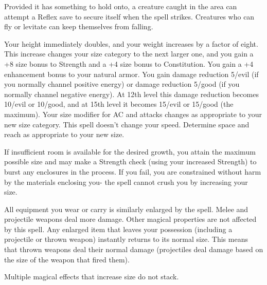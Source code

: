 \begin{multicols}{2}
\begin{small}
\smallskip\noindent Provided it has something to hold onto, a creature caught in the area can attempt a Reflex save to secure itself when the spell strikes. Creatures who can fly or levitate can keep themselves from falling.


\noindent Your height immediately doubles, and your weight increases by a factor of eight. This increase changes your size category to the next larger one, and you gain a +8 size bonus to Strength and a +4 size bonus to Constitution. You gain a +4 enhancement bonus to your natural armor. You gain damage reduction 5/evil (if you normally channel positive energy) or damage reduction 5/good (if you normally channel negative energy). At 12th level this damage reduction becomes 10/evil or 10/good, and at 15th level it becomes 15/evil or 15/good (the maximum). Your size modifier for AC and attacks changes as appropriate to your new size category. This spell doesn't change your speed.  Determine space and reach as appropriate to your new size.

\smallskip\noindent If insufficient room is available for the desired growth, you attain the maximum possible size and may make a Strength check (using your increased Strength) to burst any enclosures in the process. If you fail, you are constrained without harm by the materials enclosing you- the spell cannot crush you by increasing your size.

\smallskip\noindent All equipment you wear or carry is similarly enlarged by the spell. Melee and projectile weapons deal more damage. Other magical properties are not affected by this spell. Any enlarged item that leaves your possession (including a projectile or thrown weapon) instantly returns to its normal size. This means that thrown weapons deal their normal damage (projectiles deal damage based on the size of the weapon that fired them).

\smallskip\noindent Multiple magical effects that increase size do not stack.


\end{small}
\end{multicols}
